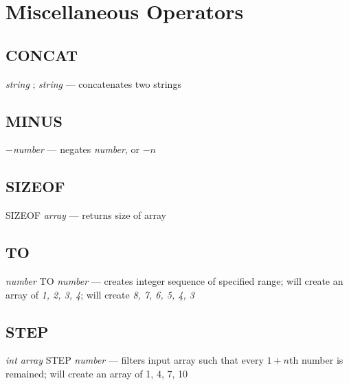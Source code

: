 \section{Miscellaneous Operators}

\subsection{CONCAT} \emph{string} ; \emph{string} --- concatenates two strings
\subsection{MINUS} $-$\emph{number} --- negates \emph{number}, or $-n$
\subsection{SIZEOF} SIZEOF \emph{array} --- returns size of array
\subsection{TO} \emph{number} TO \emph{number} --- creates integer sequence of specified range;  will create an array of \emph{1, 2, 3, 4};  will create \emph{8, 7, 6, 5, 4, 3}
\subsection{STEP} \emph{int array} STEP \emph{number} --- filters input array such that every $1+n$th number is remained;  will create an array of {1, 4, 7, 10}